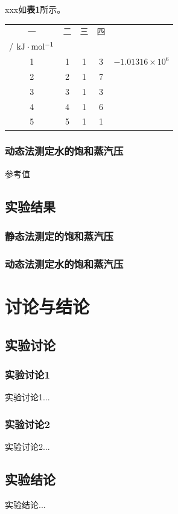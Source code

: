 \documentclass[12pt]{article}
\begin{document}
 		xxx如\textbf{表1}所示。
 		
 		  \begin{table}[h]
 			\centering
 			\begin{tabular}{ccccc}
 				\toprule
 				一 & 二 & 三 & 四 & \thead[c] {$E_{trans}$ \\ / $ \rm kJ \cdot mol^{-1} $} \\
 				\midrule
 				1 & 1 & 1 & 3 & $-1.01316\times10^{6}$ \\
 				2 & 2 & 1 & 7 & \\
 				3 & 3 & 1 & 3 & \\
 				4 & 4 & 1 & 6 & \\
 				5 & 5 & 1 & 1 & \\
 				\bottomrule
 			\end{tabular}
 		\end{table}
 		\vbox{}
 		\subsubsection{动态法测定水的饱和蒸汽压}

 	
 		参考值\citealp{dean1992lange} 

 		\subsection{实验结果}
 		\subsubsection{静态法测定的饱和蒸汽压}
 		\subsubsection{动态法测定水的饱和蒸汽压}
 		
 		

 	
	\vbox{}  	
 	\section{讨论与结论}
		\subsection{实验讨论}
 		\subsubsection{实验讨论1}
 	 	实验讨论1...
 	 	\subsubsection{实验讨论2}
 	 	实验讨论2...
 	 	\subsection{实验结论}
 	 	实验结论...

	\vbox{}  

	
	
\end{document}
